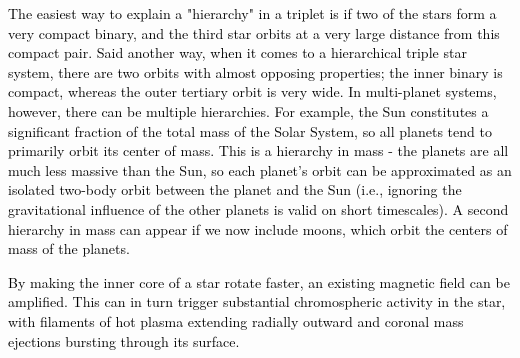 \documentclass[main.tex]{subfiles}
\begin{document}
\begin{tcolorbox}[sharp corners, colback=red!30, colframe=red!80!blue, title=Box \refstepcounter{educhap1}\label{boxchap1:oh}\ref{boxchap1:oh} -- Orbital Hierarchies]
\par \textcolor{black}{The easiest way to explain a "hierarchy" in a triplet is if two of the stars form a very compact binary, and the third star orbits at a very large distance from this compact pair.  Said another way, when it comes to a hierarchical triple star system, there are two orbits with almost opposing properties; the inner binary is compact, whereas the outer tertiary orbit is very wide.  In multi-planet systems, however, there can be multiple hierarchies.  For example, the Sun constitutes a significant fraction of the total mass of the Solar System, so all planets tend to primarily orbit its center of mass.  This is a hierarchy in mass - the planets are all much less massive than the Sun, so each planet's orbit can be approximated as an isolated two-body orbit between the planet and the Sun (i.e., ignoring the gravitational influence of the other planets is valid on short timescales). A second hierarchy in mass can appear if we now include moons, which orbit the centers of mass of the planets.}
\end{tcolorbox}

\begin{tcolorbox}[sharp corners, colback=red!30, colframe=red!80!blue, title=Box \refstepcounter{educhap1}\label{boxchap1:mf}\ref{boxchap1:mf} -- Magnetic Fields and Dynamos]
\par \textcolor{black} {By making the inner core of a star rotate faster, an existing magnetic field can be amplified.   This can in turn trigger substantial chromospheric activity in the star, with filaments of hot plasma extending radially outward and coronal mass ejections bursting through its surface.}  
\end{tcolorbox}
\end{document}
